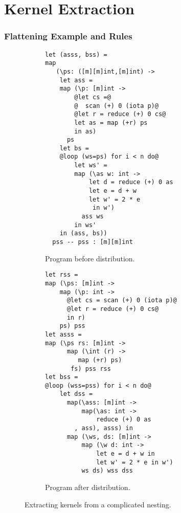 \chapter{Kernel Extraction}
\label{chap:kernel-extraction}


\subsection{Flattening Example and Rules}
\label{subsec:kernel-extraction}

\begin{figure}
\begin{subfigure}{0.48\columnwidth}
\begin{lstlisting}
let (asss, bss) =
map
   (\ps: ([m][m]int,[m]int) ->
    let ass =
    map (\p: [m]int ->
        @let cs =@
        @  scan (+) 0 (iota p)@
        @let r = reduce (+) 0 cs@
        let as = map (+r) ps
        in as)
      ps
    let bs =
    @loop (ws=ps) for i < n do@
        let ws' =
        map (\as w: int ->
            let d = reduce (+) 0 as
            let e = d + w
            let w' = 2 * e
             in w')
          ass ws
        in ws'
    in (ass, bs))
  pss -- pss : [m][m]int
\end{lstlisting}
\caption{Program before distribution.}
\label{fig:before-distrib}
\end{subfigure}
\begin{subfigure}{0.49\columnwidth}
\begin{lstlisting}
let rss =
map (\ps: [m]int ->
    map (\p: int ->
      @let cs = scan (+) 0 (iota p)@
      @let r = reduce (+) 0 cs@
      in r)
    ps) pss
let asss =
map (\ps rs: [m]int ->
      map (\int (r) ->
         map (+r) ps)
       fs) pss rss
let bss =
@loop (wss=pss) for i < n do@
    let dss =
      map(\ass: [m]int ->
          map(\as: int ->
              reduce (+) 0 as
        , ass), asss) in
      map (\ws, ds: [m]int ->
          map (\w d: int ->
              let e = d + w in
              let w' = 2 * e in w')
          ws ds) wss dss
\end{lstlisting}
\caption{Program after distribution.}
\label{fig:after-result}
\end{subfigure}
\caption{Extracting kernels from a complicated nesting.}
\end{figure}




